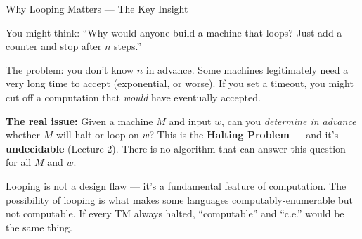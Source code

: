 \documentclass[11pt,a4paper]{article}
\newcommand{\kt}[1]{\par\vspace{0.3em}\colorbox{yellow!60}{\parbox{\dimexpr\linewidth-2\fboxsep}{#1}}\vspace{0.3em}}
\begin{document}
\begin{conceptbox}{Why Looping Matters --- The Key Insight}

You might think: ``Why would anyone build a machine that loops? Just add a counter and stop after $n$ steps.''

The problem: you don't know $n$ in advance. Some machines legitimately need a very long time to accept (exponential, or worse). If you set a timeout, you might cut off a computation that \textit{would} have eventually accepted.

\textbf{The real issue:} Given a machine $M$ and input $w$, can you \textit{determine in advance} whether $M$ will halt or loop on $w$? This is the \textbf{Halting Problem} --- and it's \textbf{undecidable} (Lecture 2). There is no algorithm that can answer this question for all $M$ and $w$.

\kt{Looping is not a design flaw --- it's a fundamental feature of computation. The possibility of looping is what makes some languages computably-enumerable but not computable. If every TM always halted, ``computable'' and ``c.e.'' would be the same thing.}
\end{conceptbox}
\end{document}
